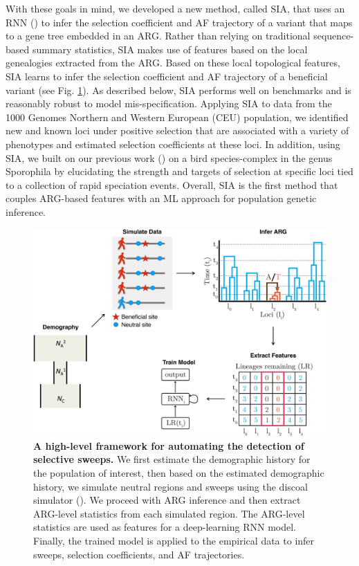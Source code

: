 With these goals in mind, we developed a new method, called \acf{SIA}, that uses an \ac{RNN} (\cite{hochreiter_long_1997,maas_learning_2011}) to infer the selection coefficient and \ac{AF} trajectory of a variant that maps to a gene tree embedded in an \ac{ARG}. Rather than relying on traditional sequence-based summary statistics, \ac{SIA} makes use of features based on the local genealogies extracted from the \ac{ARG}. Based on these local topological features, \ac{SIA} learns to infer the selection coefficient and \ac{AF} trajectory of a beneficial variant (see Fig. \ref{fig:SIA-F1}). As described below, \ac{SIA} performs well on benchmarks and is reasonably robust to model mis-specification. Applying \ac{SIA} to data from the 1000 Genomes Northern and Western European (CEU) population, we identified new and known loci under positive selection that are associated with a variety of phenotypes and estimated selection coefficients at these loci. In addition, using \ac{SIA}, we built on our previous work (\cite{hejase_genomic_2020}) on a bird species-complex in the genus Sporophila by elucidating the strength and targets of selection at specific loci tied to a collection of rapid speciation events. Overall, \ac{SIA} is the first method that couples \ac{ARG}-based features with an \ac{ML} approach for population genetic inference.

\begin{figure}[h]
    \centering
    \includegraphics[width=\textwidth]{SIA_figs/SIA_F1.jpeg}
    \caption[A high-level framework for automating the detection of selective sweeps.]{\textbf{A high-level framework for automating the detection of selective sweeps.} We first estimate the demographic history for the population of interest, then based on the estimated demographic history, we simulate neutral regions and sweeps using the discoal simulator (\cite{kern_discoal_2016}). We proceed with \ac{ARG} inference and then extract \ac{ARG}-level statistics from each simulated region. The \ac{ARG}-level statistics are used as features for a deep-learning \ac{RNN} model. Finally, the trained model is applied to the empirical data to infer sweeps, selection coefficients, and \ac{AF} trajectories.}
    \label{fig:SIA-F1}
\end{figure}

